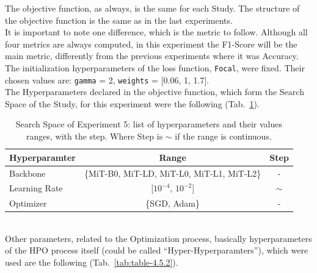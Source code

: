 The objective function, as always, is the same for each Study. The structure of the objective function is the same as in the last experiments.
\\[0.3cm]It is important to note one difference, which is the metric to follow. Although all four metrics are always computed, in this experiment the F1-Score will be the main metric, differently from the previous experiments where it was Accuracy.
\\[0.3cm]The initialization hyperparameters of the loss function, \texttt{Focal}, were fixed. Their chosen values are: \texttt{gamma} = 2, \texttt{weights} = [0.06, 1, 1.7].
% 
\\[0.3cm]The Hyperparameters declared in the objective function, which form the Search Space of the Study, for this experiment were the following (Tab.~\ref{tab:table-4.5.1}).
\begin{table}[ht!]
	\center
	\setlength{\tabcolsep}{0.5cm}
	\caption[Search Space of Experiment 5]{Search Space of Experiment 5: list of hyperparameters and their values ranges, with the step. Where Step is $\sim$ if the range is continuous.}
	\begin{tabular}{@{}lcc@{}}
		\toprule
		\textbf{Hyperparamter} & \textbf{Range}                             & \textbf{Step} \\ \midrule
		Backbone               & \{MiT-B0, MiT-LD, MiT-L0, MiT-L1, MiT-L2\} & -             \\[0.1cm]
		Learning Rate          & {[}$10^{-4}$, $10^{-2}${]}                 & $\sim$        \\[0.1cm]
		Optimizer              & \{SGD, Adam\}                              & -             \\ \bottomrule
	\end{tabular}
	\label{tab:table-4.5.1}
\end{table}
% 
\\[0.3cm]Other parameters, related to the Optimization process, basically hyperparameters of the HPO process itself (could be called “Hyper-Hyperparamters”), which were used are the following (Tab.~\ref{tab:table-4.5.2}).

